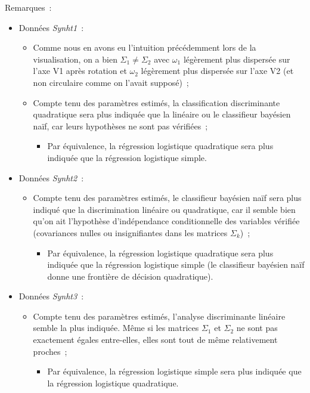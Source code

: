 \documentclass[a4paper,10pt]{report}
\begin{document}
Remarques~:
\begin{itemize}
	\item Données \textit{Synht1}~:
	\begin{itemize}
		\item Comme nous en avons eu l'intuition précédemment lors de la visualisation, on a bien $\Sigma_{1} \neq \Sigma_{2}$ avec $\omega_1$ légèrement plus dispersée sur l'axe V1 après rotation et $\omega_2$ légèrement plus dispersée sur l'axe V2 (et non circulaire comme on l'avait supposé)~;
		\item Compte tenu des paramètres estimés, la classification discriminante quadratique sera plus indiquée que la linéaire ou le classifieur bayésien naïf, car leurs hypothèses ne sont pas vérifiées~;
		\begin{itemize}
			\item Par équivalence, la régression logistique quadratique sera plus indiquée que la régression logistique simple.
		\end{itemize}
	\end{itemize}
	\item Données \textit{Synht2}~:
	\begin{itemize}
		\item Compte tenu des paramètres estimés, le classifieur bayésien naïf sera plus indiqué que la discrimination linéaire ou quadratique, car il semble bien qu'on ait l'hypothèse d'indépendance conditionnelle des variables vérifiée (covariances nulles ou insignifiantes dans les matrices $\Sigma_k$)~;
		\begin{itemize}
			\item Par équivalence, la régression logistique quadratique sera plus indiquée que la régression logistique simple (le classifieur bayésien naïf donne une frontière de décision quadratique).
		\end{itemize}
	\end{itemize}
	\item Données \textit{Synht3}~:
	\begin{itemize}
		\item Compte tenu des paramètres estimés, l'analyse discriminante linéaire semble la plus indiquée. Même si les matrices $\Sigma_{1}$ et $\Sigma_{2}$ ne sont pas exactement égales entre-elles, elles sont tout de même relativement proches~;
		\begin{itemize}
			\item Par équivalence, la régression logistique simple sera plus indiquée que la régression logistique quadratique.
		\end{itemize}
	\end{itemize}

\end{itemize}
\end{document}
